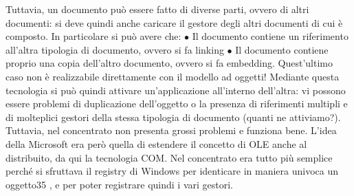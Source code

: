 Tuttavia, un documento può essere fatto di diverse parti, ovvero di altri
documenti: si deve quindi anche caricare il gestore degli altri documenti di cui
è composto. In particolare si può avere che:
$\bullet$ Il documento contiene un riferimento all'altra tipologia di documento,
ovvero si fa linking
$\bullet$ Il documento contiene proprio una copia dell'altro documento, ovvero si
fa embedding. Quest'ultimo caso non è realizzabile direttamente con il
modello ad oggetti!
Mediante questa tecnologia si può quindi attivare un'applicazione all'interno
dell'altra: vi possono essere problemi di duplicazione dell'oggetto o la presenza
di riferimenti multipli e di molteplici gestori della stessa tipologia di documento
(quanti ne attiviamo?). Tuttavia, nel concentrato non presenta grossi problemi
e funziona bene.
L'idea della Microsoft era però quella di estendere il concetto di OLE anche
al distribuito, da qui la tecnologia COM. Nel concentrato era tutto più semplice
perché si sfruttava il registry di Windows per identicare in maniera univoca un
oggetto35 , e per poter registrare quindi i vari gestori.
